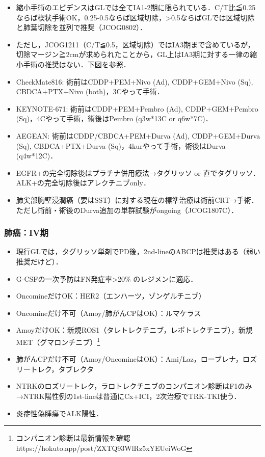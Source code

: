 \begin{itemize}
\item 縮小手術のエビデンスはGLでは全てIA1-2期に限られている．C/T比≦0.25ならば楔状手術OK，0.25-0.5ならば区域切除，>0.5ならばGLでは区域切除と肺葉切除を並列で推奨（JCOG0802）．
\item ただし，JCOG1211（C/T≦0.5，区域切除）ではIA3期まで含めているが，切除マージン≧2cmが求められたことから，GL上はIA3期に対する一律の縮小手術の推奨はない．下図を参照．


\item CheckMate816: 術前はCDDP+PEM+Nivo (Ad), CDDP+GEM+Nivo (Sq), CBDCA+PTX+Nivo (both)，3Cやって手術．
\item KEYNOTE-671: 術前はCDDP+PEM+Pembro (Ad), CDDP+GEM+Pembro (Sq)，4Cやって手術，術後はPembro (q3w*13C or q6w*7C)．
\item AEGEAN: 術前はCDDP/CBDCA+PEM+Durva (Ad), CDDP+GEM+Durva (Sq), CBDCA+PTX+Durva (Sq)，4kurやって手術，術後はDurva (q4w*12C)．
\item EGFR+の完全切除後はプラチナ併用療法→タグリッソ or 直でタグリッソ．ALK+の完全切除後はアレクチニブonly．
\item 肺尖部胸壁浸潤癌（要はSST）に対する現在の標準治療は術前CRT→手術．ただし術前・術後のDurva追加の単群試験がongoing（JCOG1807C）．
\end{itemize}


\subsubsection{肺癌：IV期}

\begin{itemize}
\item 現行GLでは，タグリッソ単剤でPD後，2nd-lineのABCPは推奨はある（弱い推奨だけど）．
\item G-CSFの一次予防はFN発症率>20\% のレジメンに適応．
\item OncomineだけOK：HER2（エンハーツ，ゾンゲルチニブ）
\item Oncomineだけ不可（Amoy/肺がんCPはOK）：ルマケラス
\item AmoyだけOK：新規ROS1（タレトレクチニブ，レポトレクチニブ），新規MET（グマロンチニブ）\footnote{コンパニオン診断は最新情報を確認 https://hokuto.app/post/ZXTQ93WlRz5xYEUeiWoG}
\item 肺がんCPだけ不可（Amoy/OncomineはOK）：Ami/Laz，ローブレナ，ロズリートレク，タブレクタ
\item NTRKのロズリートレク，ラロトレクチニブのコンパニオン診断はF1のみ→NTRK陽性例の1st-lineは普通にCx+ICI，2次治療でTRK-TKI使う．
\item 炎症性偽腫瘍でALK陽性．
\end{itemize}


